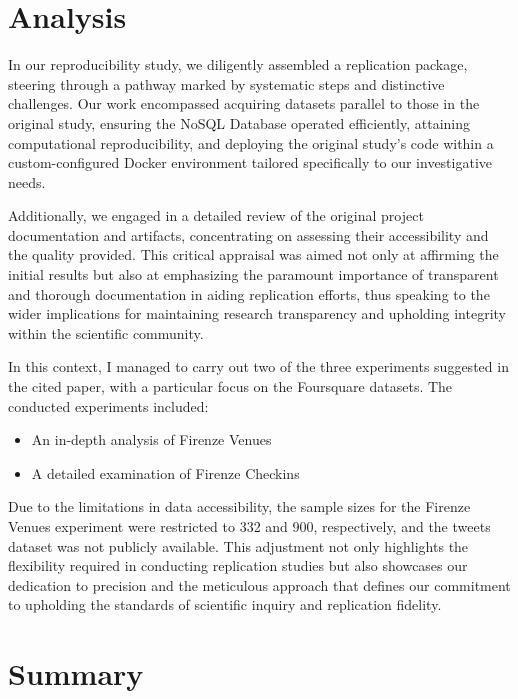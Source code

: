 \documentclass[sigconf, nonacm]{acmart}
\begin{document}
\section{\textbf{Analysis  }}

In our reproducibility study, we diligently assembled a replication package, steering through a pathway marked by systematic steps and distinctive challenges. Our work encompassed acquiring datasets parallel to those in the original study, ensuring the NoSQL Database operated efficiently, attaining computational reproducibility, and deploying the original study's code within a custom-configured Docker environment tailored specifically to our investigative needs.

Additionally, we engaged in a detailed review of the original project documentation and artifacts, concentrating on assessing their accessibility and the quality provided. This critical appraisal was aimed not only at affirming the initial results but also at emphasizing the paramount importance of transparent and thorough documentation in aiding replication efforts, thus speaking to the wider implications for maintaining research transparency and upholding integrity within the scientific community.

 In this context, I managed to carry out two of the three experiments suggested in the cited paper\cite{8424731}, with a particular focus on the Foursquare datasets. The conducted experiments included:

 \begin{itemize}
     \item An in-depth analysis of Firenze Venues
     \item A detailed examination of Firenze Checkins
 \end{itemize}

Due to the limitations in data accessibility, the sample sizes for the Firenze Venues experiment were restricted to 332 and 900, respectively, and the tweets dataset  was not publicly available. This adjustment not only highlights the flexibility required in conducting replication studies but also showcases our dedication to precision and the meticulous approach that defines our commitment to upholding the standards of scientific inquiry and replication fidelity.\newpage



\section{\textbf{Summary}  }
\end{document}
